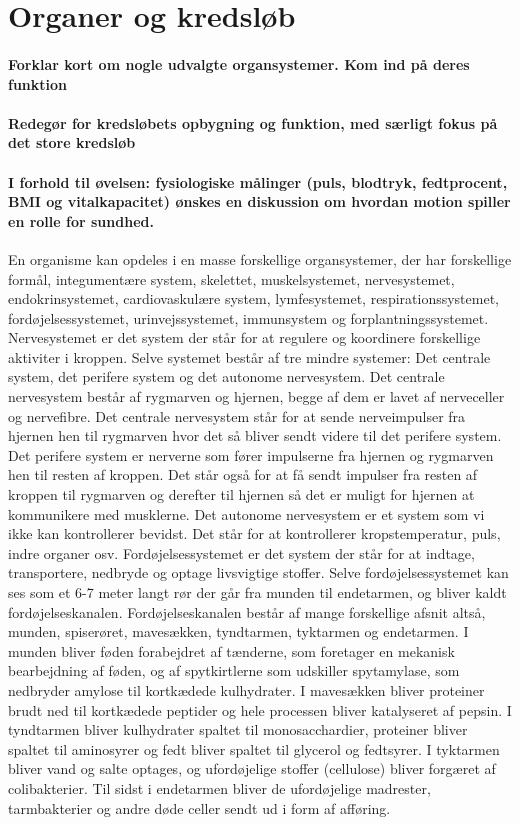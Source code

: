 \newpage
\part{Organer og kredsløb}
\subsection*{Forklar kort om nogle udvalgte organsystemer. Kom ind på deres funktion}
\subsection*{Redegør for kredsløbets opbygning og funktion, med særligt fokus på det store kredsløb}
\subsection*{I forhold til øvelsen: fysiologiske målinger (puls, blodtryk, fedtprocent, BMI og vitalkapacitet) ønskes en diskussion om hvordan motion spiller en rolle for sundhed.}
En organisme kan opdeles i en masse forskellige organsystemer, der har forskellige formål, integumentære system, skelettet, muskelsystemet, nervesystemet, endokrinsystemet, cardiovaskulære system, lymfesystemet, respirationssystemet, fordøjelsessystemet, urinvejssystemet, immunsystem og forplantningssystemet. 
Nervesystemet er det system der står for at regulere og koordinere forskellige aktiviter i kroppen. Selve systemet består af tre mindre systemer: Det centrale system, det perifere system og det autonome nervesystem. Det centrale nervesystem består af rygmarven og hjernen, begge af dem er lavet af nerveceller og nervefibre. Det centrale nervesystem står for at sende nerveimpulser fra hjernen hen til rygmarven hvor det så bliver sendt videre til det perifere system. Det perifere system er nerverne som fører impulserne fra hjernen og rygmarven hen til resten af kroppen. Det står også for at få sendt impulser fra resten af kroppen til rygmarven og derefter til hjernen så det er muligt for hjernen at kommunikere med musklerne. Det autonome nervesystem er et system som vi ikke kan kontrollerer bevidst. Det står for at kontrollerer kropstemperatur, puls, indre organer osv. 
Fordøjelsessystemet er det system der står for at indtage, transportere, nedbryde og optage livsvigtige stoffer. Selve fordøjelsessystemet kan ses som et 6-7 meter langt rør der går fra munden til endetarmen, og bliver kaldt fordøjelseskanalen. Fordøjelseskanalen består af mange forskellige afsnit altså, munden, spiserøret, mavesækken, tyndtarmen, tyktarmen og endetarmen. I munden bliver føden forabejdret af tænderne, som foretager en mekanisk bearbejdning af føden, og af spytkirtlerne som udskiller spytamylase, som nedbryder amylose til kortkædede kulhydrater. I mavesækken bliver proteiner brudt ned til kortkædede peptider og hele processen bliver katalyseret af pepsin. I tyndtarmen bliver kulhydrater spaltet til monosacchardier, proteiner bliver spaltet til aminosyrer og fedt bliver spaltet til glycerol og fedtsyrer. I tyktarmen bliver vand og salte optages, og ufordøjelige stoffer (cellulose) bliver forgæret af colibakterier. Til sidst i endetarmen bliver de ufordøjelige madrester, tarmbakterier og andre døde celler sendt ud i form af afføring.
